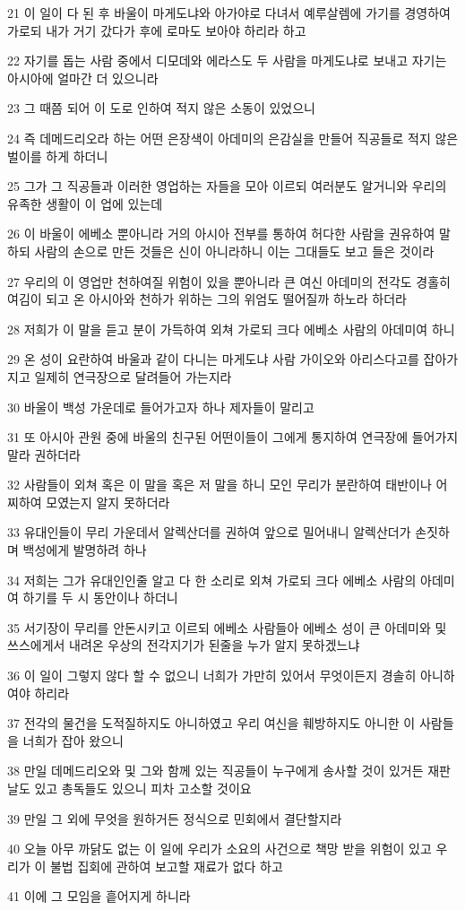 \par 21 이 일이 다 된 후 바울이 마게도냐와 아가야로 다녀서 예루살렘에 가기를 경영하여 가로되 내가 거기 갔다가 후에 로마도 보아야 하리라 하고
\par 22 자기를 돕는 사람 중에서 디모데와 에라스도 두 사람을 마게도냐로 보내고 자기는 아시아에 얼마간 더 있으니라
\par 23 그 때쯤 되어 이 도로 인하여 적지 않은 소동이 있었으니
\par 24 즉 데메드리오라 하는 어떤 은장색이 아데미의 은감실을 만들어 직공들로 적지 않은 벌이를 하게 하더니
\par 25 그가 그 직공들과 이러한 영업하는 자들을 모아 이르되 여러분도 알거니와 우리의 유족한 생활이 이 업에 있는데
\par 26 이 바울이 에베소 뿐아니라 거의 아시아 전부를 통하여 허다한 사람을 권유하여 말하되 사람의 손으로 만든 것들은 신이 아니라하니 이는 그대들도 보고 들은 것이라
\par 27 우리의 이 영업만 천하여질 위험이 있을 뿐아니라 큰 여신 아데미의 전각도 경홀히 여김이 되고 온 아시아와 천하가 위하는 그의 위엄도 떨어질까 하노라 하더라
\par 28 저희가 이 말을 듣고 분이 가득하여 외쳐 가로되 크다 에베소 사람의 아데미여 하니
\par 29 온 성이 요란하여 바울과 같이 다니는 마게도냐 사람 가이오와 아리스다고를 잡아가지고 일제히 연극장으로 달려들어 가는지라
\par 30 바울이 백성 가운데로 들어가고자 하나 제자들이 말리고
\par 31 또 아시아 관원 중에 바울의 친구된 어떤이들이 그에게 통지하여 연극장에 들어가지 말라 권하더라
\par 32 사람들이 외쳐 혹은 이 말을 혹은 저 말을 하니 모인 무리가 분란하여 태반이나 어찌하여 모였는지 알지 못하더라
\par 33 유대인들이 무리 가운데서 알렉산더를 권하여 앞으로 밀어내니 알렉산더가 손짓하며 백성에게 발명하려 하나
\par 34 저희는 그가 유대인인줄 알고 다 한 소리로 외쳐 가로되 크다 에베소 사람의 아데미여 하기를 두 시 동안이나 하더니
\par 35 서기장이 무리를 안돈시키고 이르되 에베소 사람들아 에베소 성이 큰 아데미와 및 쓰스에게서 내려온 우상의 전각지기가 된줄을 누가 알지 못하겠느냐
\par 36 이 일이 그렇지 않다 할 수 없으니 너희가 가만히 있어서 무엇이든지 경솔히 아니하여야 하리라
\par 37 전각의 물건을 도적질하지도 아니하였고 우리 여신을 훼방하지도 아니한 이 사람들을 너희가 잡아 왔으니
\par 38 만일 데메드리오와 및 그와 함께 있는 직공들이 누구에게 송사할 것이 있거든 재판 날도 있고 총독들도 있으니 피차 고소할 것이요
\par 39 만일 그 외에 무엇을 원하거든 정식으로 민회에서 결단할지라
\par 40 오늘 아무 까닭도 없는 이 일에 우리가 소요의 사건으로 책망 받을 위험이 있고 우리가 이 불법 집회에 관하여 보고할 재료가 없다 하고
\par 41 이에 그 모임을 흩어지게 하니라

